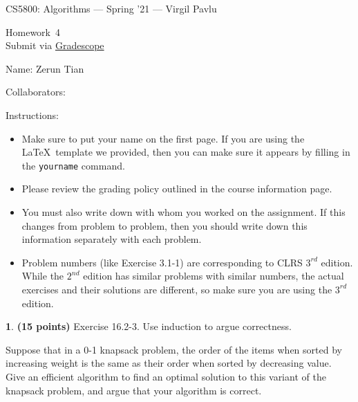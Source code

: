 \documentclass[11pt]{article}
\newcommand{\yourname}{Zerun Tian}
\newcommand{\yourcollaborators}{}
\theoremstyle{definition}
\newcommand{\instructor}{Virgil Pavlu}
\newcommand{\hwnum}{4}
\theoremstyle{theorem}
\newtheorem{prob}{}
\newcommand{\solution}{\medskip\noindent{\color{DarkBlue}\textbf{Solution:}}}
\begin{document}
{\Large 
\begin{center}{CS5800: Algorithms} --- Spring '21 --- \instructor \end{center}}
{\large
\vspace{10pt}
\noindent Homework~\hwnum \vspace{2pt}\\
Submit via \href{https://www.gradescope.com/courses/232127}{Gradescope}}

\bigskip
{\large \noindent Name: \yourname }

{\large \noindent Collaborators: \yourcollaborators}

\vspace{15pt}

{\large \noindent Instructions:}

\begin{itemize}

\item Make sure to put your name on the first page.  If you are using the \LaTeX~template we provided, then you can make sure it appears by filling in the \texttt{yourname} command.

\item Please review the grading policy outlined in the course information page.

\item You must also write down with whom you worked on the assignment.  If this changes from problem to problem, then you should write down this information separately with each problem.

\item Problem numbers (like Exercise 3.1-1) are corresponding to CLRS $3^{rd}$ edition.  While the  $2^{nd}$ edition  has  similar  problems  with  similar  numbers,  the  actual  exercises  and their solutions are different, so make sure you are using the $3^{rd}$ edition.

\end{itemize}

\newpage
\begin{prob} \textbf{(15 points)} Exercise 16.2-3. Use induction to argue correctness.
\end{prob}
Suppose that in a 0-1 knapsack problem, the order of the items when sorted by increasing weight is the same as their order when sorted by decreasing value. Give an efficient algorithm to find an optimal solution to this variant of the knapsack problem, and argue that your algorithm is correct.

\solution
\end{document}
